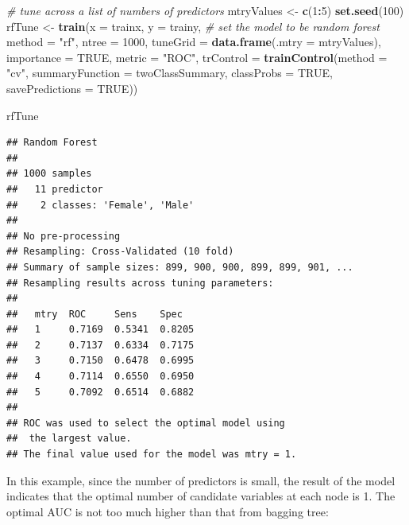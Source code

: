 \documentclass[12pt,]{krantz}
\makeatletter
\newenvironment{Shaded}{\begin{snugshade}}{\end{snugshade}}
\newcommand{\CommentTok}[1]{\textcolor[rgb]{0.37,0.37,0.37}{\textit{#1}}}
\newcommand{\DataTypeTok}[1]{\textcolor[rgb]{0.27,0.27,0.27}{#1}}
\newcommand{\DecValTok}[1]{\textcolor[rgb]{0.06,0.06,0.06}{#1}}
\newcommand{\KeywordTok}[1]{\textcolor[rgb]{0.27,0.27,0.27}{\textbf{#1}}}
\newcommand{\NormalTok}[1]{#1}
\newcommand{\OperatorTok}[1]{\textcolor[rgb]{0.43,0.43,0.43}{\textbf{#1}}}
\newcommand{\OtherTok}[1]{\textcolor[rgb]{0.37,0.37,0.37}{#1}}
\newcommand{\StringTok}[1]{\textcolor[rgb]{0.5,0.5,0.5}{#1}}
\newenvironment{kframe}{%
\medskip{}
\setlength{\fboxsep}{.8em}
 \def\at@end@of@kframe{}%
 \ifinner\ifhmode%
  \def\at@end@of@kframe{\end{minipage}}%
  \begin{minipage}{\columnwidth}%
 \fi\fi%
 \def\FrameCommand##1{\hskip\@totalleftmargin \hskip-\fboxsep
 \colorbox{shadecolor}{##1}\hskip-\fboxsep
     \hskip-\linewidth \hskip-\@totalleftmargin \hskip\columnwidth}%
 \MakeFramed {\advance\hsize-\width
   \@totalleftmargin\z@ \linewidth\hsize
   \@setminipage}}%
 {\par\unskip\endMakeFramed%
 \at@end@of@kframe}
\renewenvironment{Shaded}{\begin{kframe}}{\end{kframe}}
\makeatother
\begin{document}
\begin{Shaded}
\begin{Highlighting}[]
\CommentTok{# tune across a list of numbers of predictors}
\NormalTok{mtryValues <-}\StringTok{ }\KeywordTok{c}\NormalTok{(}\DecValTok{1}\OperatorTok{:}\DecValTok{5}\NormalTok{)}
\KeywordTok{set.seed}\NormalTok{(}\DecValTok{100}\NormalTok{)}
\NormalTok{rfTune <-}\StringTok{ }\KeywordTok{train}\NormalTok{(}\DataTypeTok{x =}\NormalTok{ trainx, }
               \DataTypeTok{y =}\NormalTok{ trainy,}
               \CommentTok{# set the model to be random forest}
               \DataTypeTok{method =} \StringTok{"rf"}\NormalTok{,}
               \DataTypeTok{ntree =} \DecValTok{1000}\NormalTok{,}
               \DataTypeTok{tuneGrid =} \KeywordTok{data.frame}\NormalTok{(}\DataTypeTok{.mtry =}\NormalTok{ mtryValues),}
               \DataTypeTok{importance =} \OtherTok{TRUE}\NormalTok{,}
               \DataTypeTok{metric =} \StringTok{"ROC"}\NormalTok{,}
               \DataTypeTok{trControl =} \KeywordTok{trainControl}\NormalTok{(}\DataTypeTok{method =} \StringTok{"cv"}\NormalTok{,}
                           \DataTypeTok{summaryFunction =}\NormalTok{ twoClassSummary,}
                           \DataTypeTok{classProbs =} \OtherTok{TRUE}\NormalTok{,}
                           \DataTypeTok{savePredictions =} \OtherTok{TRUE}\NormalTok{))}
\end{Highlighting}
\end{Shaded}

\begin{Shaded}
\begin{Highlighting}[]
\NormalTok{rfTune}
\end{Highlighting}
\end{Shaded}

\begin{verbatim}
## Random Forest 
## 
## 1000 samples
##   11 predictor
##    2 classes: 'Female', 'Male' 
## 
## No pre-processing
## Resampling: Cross-Validated (10 fold) 
## Summary of sample sizes: 899, 900, 900, 899, 899, 901, ... 
## Resampling results across tuning parameters:
## 
##   mtry  ROC     Sens    Spec  
##   1     0.7169  0.5341  0.8205
##   2     0.7137  0.6334  0.7175
##   3     0.7150  0.6478  0.6995
##   4     0.7114  0.6550  0.6950
##   5     0.7092  0.6514  0.6882
## 
## ROC was used to select the optimal model using
##  the largest value.
## The final value used for the model was mtry = 1.
\end{verbatim}

In this example, since the number of predictors is small, the result of the model indicates that the optimal number of candidate variables at each node is 1. The optimal AUC is not too much higher than that from bagging tree:
\end{document}
